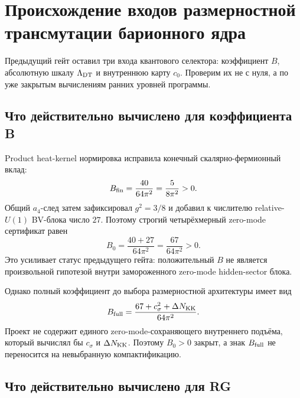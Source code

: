 \chapter{Происхождение входов размерностной трансмутации барионного ядра}
\label{ch:v8-baryon-dimensional-transmutation-input-origin-gate}

Предыдущий гейт оставил три входа квантового селектора: коэффициент $B$,
абсолютную шкалу $\Lambda_{\rm DT}$ и внутреннюю карту $c_0$. Проверим их
не с нуля, а по уже закрытым вычислениям ранних уровней программы.

\section{Что действительно вычислено для коэффициента B}

Product heat-kernel нормировка исправила конечный скалярно-фермионный вклад:
\begin{equation}
 B_{\rm fin}=\frac{40}{64\pi^2}=\frac5{8\pi^2}>0.
 \label{eq:v8-baryon-transmutation-finite-b}
\end{equation}
Общий $a_4$-след затем зафиксировал $g^2=3/8$ и добавил к числителю
relative-$U(1)$ BV-блока число $27$. Поэтому строгий четырёхмерный
zero-mode сертификат равен
\begin{equation}
 B_0=\frac{40+27}{64\pi^2}=\frac{67}{64\pi^2}>0.
 \label{eq:v8-baryon-transmutation-zero-mode-b}
\end{equation}
Это усиливает статус предыдущего гейта: положительный $B$ не является
произвольной гипотезой внутри замороженного zero-mode hidden-sector блока.

Однако полный коэффициент до выбора размерностной архитектуры имеет вид
\begin{equation}
 B_{\rm full}=\frac{67+c_\sigma^2+\Delta N_{\rm KK}}{64\pi^2}.
 \label{eq:v8-baryon-transmutation-full-b}
\end{equation}
Проект не содержит единого zero-mode-сохраняющего внутреннего подъёма,
который вычислял бы $c_\sigma$ и $\Delta N_{\rm KK}$. Поэтому
$B_0>0$ закрыт, а знак $B_{\rm full}$ не переносится на невыбранную
компактификацию.

\section{Что действительно вычислено для RG}

